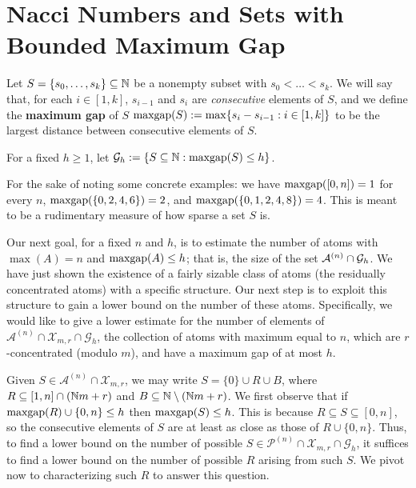 \section{Nacci Numbers and Sets with Bounded Maximum Gap}

\begin{defn} \label{def:maxgap}
Let $S = \{s_0,\dots, s_k\} \subseteq \mathbb{N}$ be a nonempty subset with $s_0 < \dots < s_k$.
We will say that, for each $i\in [1,k]$, $s_{i-1}$ and $s_i$ are \textit{consecutive} elements of $S$, and we define the \textbf{maximum gap} of $S$ $\operatorname{maxgap}(S) := \max \{s_i - s_{i-1} : i\in [1,k]\}$ to be the largest distance between consecutive elements of $S$.

For a fixed $h\ge 1$, let $\mathcal{G}_h := \{S\subseteq \mathbb{N}: \operatorname{maxgap}(S) \le h\}$.
\end{defn}

For the sake of noting some concrete examples: we have $\operatorname{maxgap}([0,n]) = 1$ for every $n$, $\operatorname{maxgap}(\{0,2,4,6\}) = 2$, and $\operatorname{maxgap}(\{0,1,2,4,8\}) = 4$.
This is meant to be a rudimentary measure of how sparse a set $S$ is.

Our next goal, for a fixed $n$ and $h$, is to estimate the number of atoms with $\max(A) = n$ and $\operatorname{maxgap}(A) \le h$; that is, the size of the set $\mathcal{A}^{(n)}\cap \mathcal{G}_h$.
We have just shown the existence of a fairly sizable class of atoms (the residually concentrated atoms) with a specific structure.  
Our next step is to exploit this structure to gain a lower bound on the number of these atoms.
Specifically, we would like to give a lower estimate for the number of elements of $\mathcal{A}^{(n)}\cap \mathcal{X}_{m,r} \cap \mathcal{G}_h$, the collection of atoms with maximum equal to $n$, which are $r$-concentrated (modulo $m$), and have a maximum gap of at most $h$.

Given $S\in \mathcal{A}^{(n)}\cap \mathcal{X}_{m,r}$, we may write $S = \{0\}\cup R \cup B$, where $R \subseteq [1,n]\cap (\mathbb{N} m+r)$ and $B\subseteq \mathbb{N}\setminus (\mathbb{N} m + r)$.
We first observe that if $\operatorname{maxgap}(R)\cup\{0,n\}\le h$ then $\operatorname{maxgap}(S)\le h$. 
This is because $R\subseteq S\subseteq [0,n]$, so the consecutive elements of $S$ are at least as close as those of $R\cup\{0,n\}$.
Thus, to find a lower bound on the number of possible $S\in \mathcal{P}^{(n)}\cap \mathcal{X}_{m,r}\cap \mathcal{G}_h$, it suffices to find a lower bound on the number of possible $R$ arising from such $S$.
We pivot now to characterizing such $R$ to answer this question.



